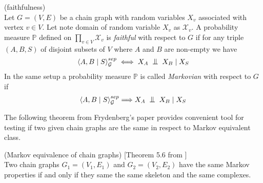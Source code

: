 \begin{defi} \label{faithDef} (faithfulness) \\
	Let $G = (V, E)$ be a chain graph with random variables $X_v$ associated with vertex $v \in V$. Let note domain of 
	random variable $X_v$ as $\mathcal{X}_v$. A probability measure $\mathbb{P}$ 
	defined on $\prod_{v \in V} \mathcal{X}_v$ is \textit{faithful} with respect to $G$ if 
	for any triple $(A, B, S)$ of disjoint subsets of $V$ where $A$ and $B$ are non-empty we have
	\begin{equation}
		\cSep{A}{B}{S}{G} \iff X_A \bigCI X_B \mid X_S
	\end{equation}
	In the same setup a probability measure $\mathbb{P}$ is called \textit{Markovian} with respect to $G$ if
	\begin{equation}
		\cSep{A}{B}{S}{G} \Longrightarrow X_A \bigCI X_B \mid X_S
	\end{equation}
\end{defi}
The following theorem from Frydenberg's paper \cite{CGMP} provides convenient tool for testing if two given 
chain graphs are the same in respect to Markov equivalent class.

\begin{prop} (Markov equivalence of chain graphs) [Theorem 5.6 from \cite{CGMP}] \\
	Two chain graphs $G_1 = (V_1, E_1)$ and $G_2 = (V_2, E_2)$ have the same Markov properties if and only if they same 
	the same skeleton and the same complexes.
\end{prop}	



